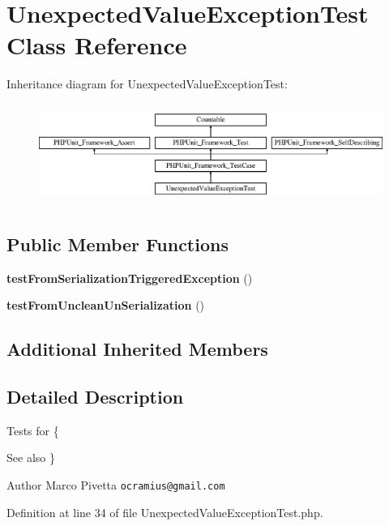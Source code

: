 \section{Unexpected\+Value\+Exception\+Test Class Reference}
\label{class_doctrine_test_1_1_instantiator_test_1_1_exception_1_1_unexpected_value_exception_test}
Inheritance diagram for Unexpected\+Value\+Exception\+Test\+:\begin{figure}[H]
\begin{center}
\leavevmode
\includegraphics[height=3.303835cm]{class_doctrine_test_1_1_instantiator_test_1_1_exception_1_1_unexpected_value_exception_test}
\end{center}
\end{figure}
\subsection*{Public Member Functions}
\begin{DoxyCompactItemize}
\item 
{\bf test\+From\+Serialization\+Triggered\+Exception} ()
\item 
{\bf test\+From\+Unclean\+Un\+Serialization} ()
\end{DoxyCompactItemize}
\subsection*{Additional Inherited Members}


\subsection{Detailed Description}
Tests for \{\begin{DoxySeeAlso}{See also}
\}
\end{DoxySeeAlso}
\begin{DoxyAuthor}{Author}
Marco Pivetta {\tt ocramius@gmail.\+com}
\end{DoxyAuthor}


Definition at line 34 of file Unexpected\+Value\+Exception\+Test.\+php.



